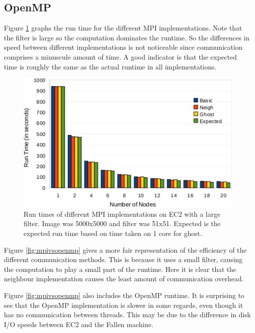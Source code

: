 \documentclass{article}
\begin{document}
\subsection{OpenMP}


Figure \ref{fig:mpi} graphs the run time for the different MPI
implementations. Note that the filter is large so the computation dominates
the runtime. So the differences in speed between different implementations is
not noticeable since communication comprises a minuscule amount of time. A
good indicator is that the expected time is roughly the same as the actual
runtime in all implementations.

\begin{figure}[h]
  \centering
  \includegraphics{images/mpi}
  \caption{Run times of different MPI implementations on EC2 with a large
    filter. Image was 5000x5000 and filter was 51x51. Expected is the expected
    run time based on time taken on 1 core for ghost.}
  \label{fig:mpi}
\end{figure}

Figure \ref{fig:mpivsopenmp} gives a more fair representation of the
efficiency of the different communication methods. This is because it uses a
small filter, causing the computation to play a small part of the
runtime. Here it is clear that the neighbour implementation causes the least
amount of communication overhead.

Figure \ref{fig:mpivsopenmp} also includes the OpenMP runtime. It is surprising
to see that the OpenMP implementation is slower in some regards, even though
it has no communication between threads. This may be due to the difference in
disk I/O speeds between EC2 and the Fallen machine.
\end{document}
